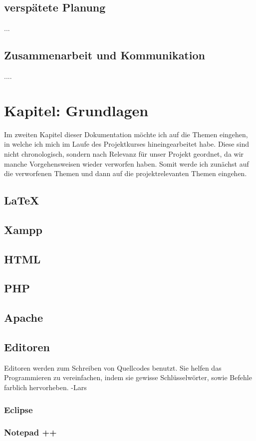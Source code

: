 \documentclass[12pt,a4paper,bibliography=totocnumbered,listof=totocnumbered]{scrartcl}
\begin{document}
\subsection{verspätete Planung}
...
\subsection{Zusammenarbeit und Kommunikation}
....

\section{Kapitel: Grundlagen}
Im zweiten Kapitel dieser Dokumentation möchte ich auf die Themen eingehen, in welche ich mich im Laufe des Projektkurses hineingearbeitet habe.
Diese sind nicht chronologisch, sondern nach Relevanz für unser Projekt geordnet, da wir manche Vorgehensweisen wieder verworfen haben.
Somit werde ich zunächst auf die verworfenen Themen und dann auf die projektrelevanten Themen eingehen.

\subsection{LaTeX}
\subsection{Xampp}
\subsection{HTML}
\subsection{PHP}
\subsection{Apache}

\subsection{Editoren}
Editoren werden zum Schreiben von Quellcodes benutzt.
Sie helfen das Programmieren zu vereinfachen, indem sie gewisse Schlüsselwörter, sowie Befehle farblich hervorheben. -Lars
\subsubsection{Eclipse}
\subsubsection{Notepad ++}
\end{document}
